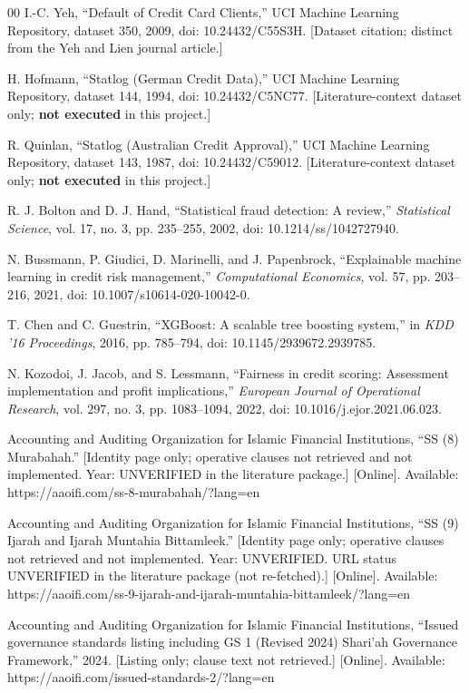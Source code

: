 \documentclass{ieeeaccess}
\begin{document}
\begin{thebibliography}{00}
 I.-C. Yeh, ``Default of Credit Card Clients,'' UCI Machine Learning Repository, dataset 350, 2009, doi: 10.24432/C55S3H. [Dataset citation; distinct from the Yeh and Lien journal article.]

 H. Hofmann, ``Statlog (German Credit Data),'' UCI Machine Learning Repository, dataset 144, 1994, doi: 10.24432/C5NC77. [Literature-context dataset only; \textbf{not executed} in this project.]

 R. Quinlan, ``Statlog (Australian Credit Approval),'' UCI Machine Learning Repository, dataset 143, 1987, doi: 10.24432/C59012. [Literature-context dataset only; \textbf{not executed} in this project.]

 R. J. Bolton and D. J. Hand, ``Statistical fraud detection: A review,'' \emph{Statistical Science}, vol. 17, no. 3, pp. 235--255, 2002, doi: 10.1214/ss/1042727940.

 N. Bussmann, P. Giudici, D. Marinelli, and J. Papenbrock, ``Explainable machine learning in credit risk management,'' \emph{Computational Economics}, vol. 57, pp. 203--216, 2021, doi: 10.1007/s10614-020-10042-0.

 T. Chen and C. Guestrin, ``XGBoost: A scalable tree boosting system,'' in \emph{KDD '16 Proceedings}, 2016, pp. 785--794, doi: 10.1145/2939672.2939785.

 N. Kozodoi, J. Jacob, and S. Lessmann, ``Fairness in credit scoring: Assessment implementation and profit implications,'' \emph{European Journal of Operational Research}, vol. 297, no. 3, pp. 1083--1094, 2022, doi: 10.1016/j.ejor.2021.06.023.

 Accounting and Auditing Organization for Islamic Financial Institutions, ``SS (8) Murabahah.'' [Identity page only; operative clauses not retrieved and not implemented. Year: UNVERIFIED in the literature package.] [Online]. Available: https://aaoifi.com/ss-8-murabahah/?lang=en

 Accounting and Auditing Organization for Islamic Financial Institutions, ``SS (9) Ijarah and Ijarah Muntahia Bittamleek.'' [Identity page only; operative clauses not retrieved and not implemented. Year: UNVERIFIED. URL status UNVERIFIED in the literature package (not re-fetched).] [Online]. Available: https://aaoifi.com/ss-9-ijarah-and-ijarah-muntahia-bittamleek/?lang=en

 Accounting and Auditing Organization for Islamic Financial Institutions, ``Issued governance standards listing including GS 1 (Revised 2024) Shari'ah Governance Framework,'' 2024. [Listing only; clause text not retrieved.] [Online]. Available: https://aaoifi.com/issued-standards-2/?lang=en

\end{thebibliography}
\end{document}
